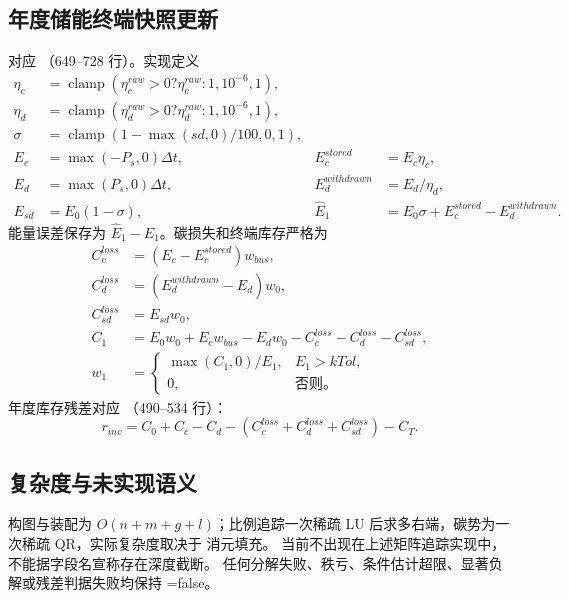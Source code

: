 \subsection{年度储能终端快照更新}
对应 
（649--728 行）。实现定义
\begin{align}
\eta_c&=\operatorname{clamp}(\eta_c^{raw}>0?\eta_c^{raw}:1,10^{-6},1),\\
\eta_d&=\operatorname{clamp}(\eta_d^{raw}>0?\eta_d^{raw}:1,10^{-6},1),\\
\sigma&=\operatorname{clamp}(1-\max(sd,0)/100,0,1),\\
E_c&=\max(-P_s,0)\Delta t,&E_c^{stored}&=E_c\eta_c,\\
E_d&=\max(P_s,0)\Delta t,&E_d^{withdrawn}&=E_d/\eta_d,\\
E_{sd}&=E_0(1-\sigma),&
\widehat E_1&=E_0\sigma+E_c^{stored}-E_d^{withdrawn}.
\end{align}
能量误差保存为 $\widehat E_1-E_1$。碳损失和终端库存严格为
\begin{align}
C_c^{loss}&=(E_c-E_c^{stored})w_{bus},\\
C_d^{loss}&=(E_d^{withdrawn}-E_d)w_0,\\
C_{sd}^{loss}&=E_{sd}w_0,\\
C_1&=E_0w_0+E_cw_{bus}-E_dw_0-C_c^{loss}-C_d^{loss}-C_{sd}^{loss},\\
w_1&=\begin{cases}\max(C_1,0)/E_1,&E_1>kTol,\\0,&\text{否则。}\end{cases}
\end{align}
年度库存残差对应 （490--534 行）：
\begin{equation}
r_{inv}=C_0+C_c-C_d-(C_c^{loss}+C_d^{loss}+C_{sd}^{loss})-C_T.
\end{equation}

\subsection{复杂度与未实现语义}
构图与装配为 $O(n+m+g+l)$；比例追踪一次稀疏 LU 后求多右端，碳势为一次稀疏 QR，实际复杂度取决于
消元填充。 当前不出现在上述矩阵追踪实现中，不能据字段名宣称存在深度截断。
任何分解失败、秩亏、条件估计超限、显著负解或残差判据失败均保持 =false。
